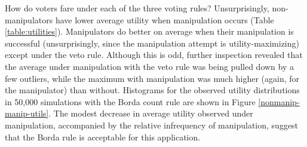 \documentclass[12pt,letterpaper]{article} %
\begin{document}
How do voters fare under each of the three voting rules? Unsurprisingly, non-manipulators have lower average utility when manipulation occurs (Table \ref{table:utilities}). Manipulators do better on average when their manipulation is successful (unsurprisingly, since the manipulation attempt is utility-maximizing) except under the veto rule. Although this is odd, further inspection revealed that the average under manipulation with the veto rule was being pulled down by a few outliers, while the maximum with manipulation was much higher (again, for the manipulator) than without. Histograms for the observed utility distributions in 50,000 simulations with the Borda count rule are shown in Figure \ref{nonmanip-manip-utils}. The modest decrease in average utility observed under manipulation, accompanied by the relative infrequency of manipulation, suggest that the Borda rule is acceptable for this application. 


\end{document}
